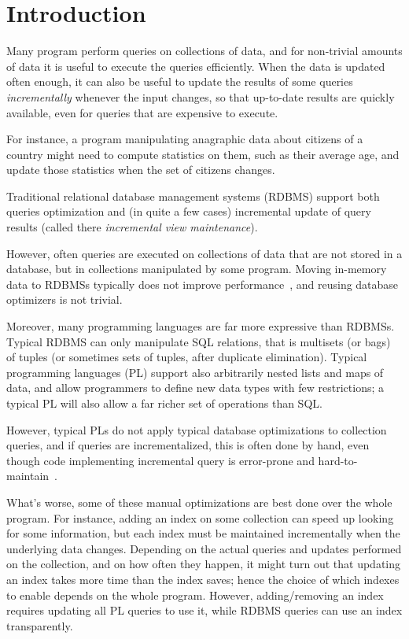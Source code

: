 \chapter{Introduction}

Many program perform queries on collections of data, and for non-trivial amounts
of data it is useful to execute the queries efficiently. When the data is
updated often enough, it can also be useful to update the results of some
queries \emph{incrementally} whenever the input changes, so that up-to-date
results are quickly available, even for queries that are expensive to execute.

For instance, a program manipulating anagraphic data about citizens of a country
might need to compute statistics on them, such as their average age, and update
those statistics when the set of citizens changes.

Traditional relational database management systems (RDBMS) support both queries
optimization and (in quite a few cases) incremental update of query results
(called there \emph{incremental view maintenance}).

However, often queries are executed on collections of data that are not stored
in a database, but in collections manipulated by some program. Moving in-memory
data to RDBMSs typically does not improve
performance~\citep{Stonebraker07,Rompf2015functional}, and reusing database
optimizers is not trivial.

Moreover, many programming languages are far more expressive than RDBMSs.
Typical RDBMS can only manipulate SQL relations, that is multisets (or bags) of
tuples (or sometimes sets of tuples, after duplicate elimination). Typical
programming languages (PL) support also arbitrarily nested lists and maps of
data, and allow programmers to define new data types with few restrictions; a
typical PL will also allow a far richer set of operations than SQL.

However, typical PLs do not apply typical database optimizations to collection
queries, and if queries are incrementalized, this is often done by hand, even
though code implementing incremental query is error-prone and
hard-to-maintain~\citep{Salvaneschi13reactive}.

What's worse, some of these manual optimizations are best done over the whole
program. For instance, adding an index on some collection can speed up looking
for some information, but each index must be maintained incrementally when the
underlying data changes. Depending on the actual queries and updates performed
on the collection, and on how often they happen, it might turn out that updating
an index takes more time than the index saves; hence the choice of which indexes
to enable depends on the whole program. However, adding/removing an index
requires updating all PL queries to use it, while RDBMS queries can use an index
transparently.

